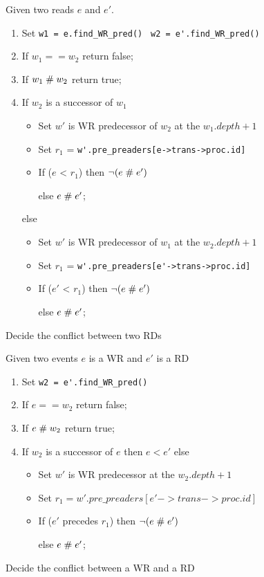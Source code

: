 \documentclass{llncs}
\begin{document}
\begin{algorithm}
	Given two reads $e$ and $e'$.
	\begin{enumerate}
		\item
		Set \verb!w1 = e.find_WR_pred() !
		\verb!w2 = e'.find_WR_pred()!
		\item
		If $w_1 == w_2$
		return false;
		\item
		If $w_1 \mathrel{\#} w_2$
		return true;
		\item
		If $w_2$ is a successor of $w_1$
		\begin{itemize}
			\item
			Set $w'$ is WR predecessor of $w_2$ at the $w_1.depth + 1$
			\item
			Set $r_1$ = \verb!w'.pre_preaders[e->trans->proc.id]!
			\item
			If ($e$ < $r_1$) then $\lnot (e \mathrel{\#} e')$
			
			else 	$e \mathrel{\#} e'$;
		\end{itemize}
		else
		\begin{itemize}
			\item
			Set $w'$ is WR predecessor of $w_1$ at the $w_2.depth + 1$
			\item
			Set $r_1$ = \verb!w'.pre_preaders[e'->trans->proc.id]!
			\item
			If ($e'$ < $r_1$) then $\lnot (e \mathrel{\#} e')$
			
			else 	$e \mathrel{\#} e'$;
		\end{itemize}
		
	\end{enumerate}
	\caption{Decide the conflict between two RDs}
	\label{a:rds}	
\end{algorithm}

\begin{algorithm}
	Given two events $e$ is a WR and $e'$ is a RD
	\begin{enumerate}
		\item
		Set 	\verb!w2 = e'.find_WR_pred()!
		\item
		If $e == w_2$
		return false;
		\item
		If $e \mathrel{\#} w_2$
		return true;
		\item
		If $w_2$ is a successor of $e$
		then $e < e'$
		else
		\begin{itemize}
			\item
			Set $w'$ is WR predecessor at the $w_2.depth + 1$
			\item
			Set $r_1 = w'.pre\_preaders[e'->trans->proc.id]$
			\item
			If ($e'$ precedes $r_1$) then $\lnot (e \mathrel{\#} e')$
			
			else 	$e \mathrel{\#} e'$;
		\end{itemize}
		
	\end{enumerate}
	\caption{Decide the conflict between a WR and a RD}
	\label{a:wrd}	
\end{algorithm}
\end{document}
